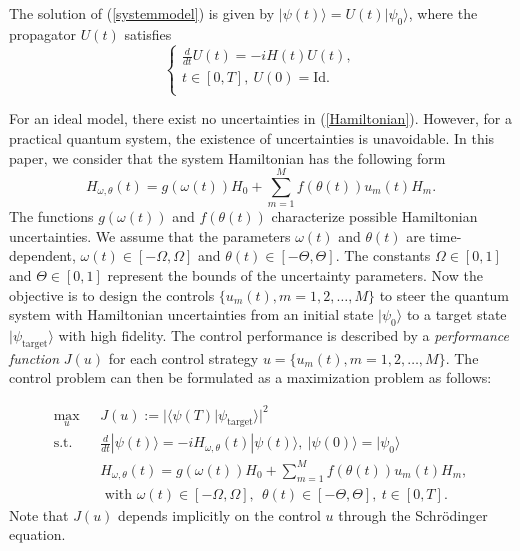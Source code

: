 \documentclass[letterpaper, 10 pt, conference]{ieeeconf}
\begin{document}
The solution of (\ref{systemmodel}) is given
by $\displaystyle |\psi(t)\rangle=U(t)|\psi_{0}\rangle$, where the
propagator $U(t)$ satisfies
\begin{equation}
\left\{ \begin{array}{c}
  \frac{d}{dt}U(t)=-iH(t)U(t),\\
  t\in [0, T], \ U(0)=\textrm{Id}.\\
\end{array}
\right.
\end{equation}

For an ideal model, there exist no uncertainties in (\ref{Hamiltonian}). However, for a practical quantum system, the existence of uncertainties is unavoidable. In this paper, we consider that the system Hamiltonian has the following form
\begin{equation}
H_{\omega, \theta}(t)=g(\omega(t))H_{0}+\sum_{m=1}^{M}f(\theta(t))u_{m}(t)H_{m}.
\end{equation}
The functions $g(\omega(t))$ and $f(\theta(t))$ characterize possible Hamiltonian uncertainties. We assume that the parameters
$\omega(t)$ and $\theta(t)$  are time-dependent, $\omega(t)\in [-\Omega, \Omega]$ and $\theta(t)\in [-\Theta, \Theta]$. The constants
$\Omega \in [0,1]$ and $\Theta \in [0,1]$ represent the bounds of
the uncertainty parameters. Now the objective is to design the controls
$\{u_{m}(t), m=1,2,\ldots , M\}$ to steer the
quantum system with Hamiltonian uncertainties from an initial state $|\psi_{0}\rangle$ to a target
state $|\psi_{\text{target}}\rangle$ with high fidelity. The control
performance is described by a \emph{performance function} $J(u)$ for
each control strategy $u=\{u_{m}(t), m=1,2,\ldots , M\}$. The
control problem can then be formulated as a maximization problem as
follows:

\begin{equation}\label{ensemble control}
\begin{split}
\displaystyle \max_u \ \ \  & J(u):=\vert
\langle\psi(T)|\psi_{\text{target}}\rangle\vert^{2}\\
\text{s.t.} \ \ \ & \frac{d}{dt}|\psi(t)\rangle=-iH_{\omega,\theta}(t)|\psi(t)\rangle, \ |\psi(0)\rangle=|\psi_{0}\rangle \\
& H_{\omega,\theta}(t)=g(\omega(t))H_{0}+\sum_{m=1}^{M}f(\theta(t))u_{m}(t)H_{m},\\
& \textrm{ with } \omega(t) \in [-\Omega,\Omega], \ \ \theta(t) \in [-\Theta,\Theta],~ t \in [0, T].
\end{split}
\end{equation}
Note that $J(u)$ depends implicitly on the control
$u$ through the Schr\"odinger equation.
\end{document}
